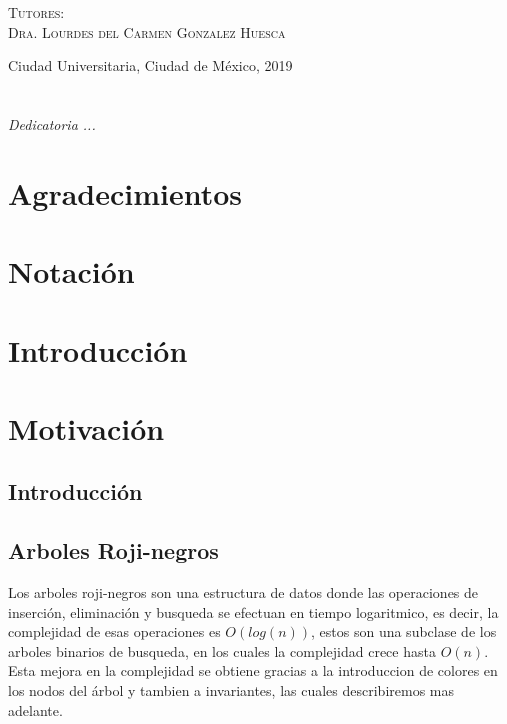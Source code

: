 \documentclass[letterpaper,12pt,oneside]{book}
\newcommand{\arns}{arboles roji-negros }
\begin{document}
\begin{titlepage}
\begin{minipage}[c][0.81\textheight][t]{0.75\textwidth}
\begin{center}
\vspace{0.5cm}

{\large\scshape Tutores:\\[0.3cm] {Dra. Lourdes del Carmen Gonzalez Huesca}}\\[.2in]

\vspace{0.5cm}

\large{Ciudad Universitaria, Ciudad de México,}{ }{2019}
\end{center}
\end{minipage}
\end{titlepage}



\frontmatter
\chapter*{}
\begin{flushright}%
\emph{Dedicatoria ...}
\thispagestyle{empty}
\end{flushright}

\chapter{Agradecimientos}

\chapter{Notación}

\chapter{Introducción}

\tableofcontents
\listoffigures


\mainmatter

\chapter{Motivación} 
\section{Introducción}
\section{Arboles Roji-negros}
Los \arns son una estructura de datos donde las operaciones de inserci\'on, eliminaci\'on y busqueda se efectuan
en tiempo logaritmico, es decir, la complejidad de esas operaciones es $O(log(n))$, estos son una subclase de los
arboles binarios de busqueda, en los cuales la complejidad crece hasta $O(n)$. Esta mejora en la complejidad se obtiene 
gracias a la introduccion de colores en los nodos del \'arbol y tambien a invariantes, las cuales describiremos 
mas adelante.
\end{document}
